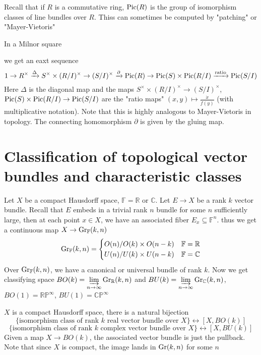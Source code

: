 \documentclass[main]{subfiles}
\begin{document}
Recall that if $R$ is a commutative ring, $\operatorname{Pic}(R)$ is the group of isomorphism classes of line bundles over $R$. Thiss can sometimes be computed by "patching" or "Mayer-Vietoris"

\begin{theorem}[In Weibel I.3]
In a Milnor square
\begin{center}
\end{center}
we get an eaxt sequence
\[1\to R^\times\xrightarrow{\Delta}S^\times\times(R/I)^\times\to(S/I)^\times\xrightarrow{\partial}\operatorname{Pic}(R)\to\operatorname{Pic}(S)\times\operatorname{Pic}(R/I)\xrightarrow{\text{ratio}}\operatorname{Pic}(S/I)\]
Here $\Delta$ is the diagonal map and the maps $S^\times\times(R/I)^\times\to(S/I)^\times$, $\operatorname{Pic}(S)\times\operatorname{Pic}(R/I)\to\operatorname{Pic}(S/I)$ are the "ratio maps" $(x,y)\mapsto\frac{\dot x}{\dot f(y)}$ (with multiplicative notation). Note that this is highly analogous to Mayer-Vietoris in topology. The connecting homomorphism $\partial$ is given by the gluing map.
\end{theorem}

\section{Classification of topological vector bundles and characteristic classes}

Let $X$ be a compact Hausdorff space, $\mathbb F=\mathbb R$ or $\mathbb C$. Let $E\to X$ be a rank $k$ vector bundle. Recall that $E$ embeds in a trivial rank $n$ bundle for some $n$ sufficiently large, then at each point $x\in X$, we have an associated fiber $E_x\subseteq\mathbb F^n$. thus we get a continuous map $X\to\operatorname{Gr}_{\mathbb F}(k,n)$
\[\operatorname{Gr}_{\mathbb F}(k,n)=
\begin{cases}
O(n)/O(k)\times O(n-k)&\mathbb F=\mathbb R \\
U(n)/U(k)\times U(n-k)&\mathbb F=\mathbb C
\end{cases}\]
Over $\operatorname{Gr}_{\mathbb F}(k,n)$, we have a canonical or universal bundle of rank $k$. Now we get classifying space $BO(k)=\displaystyle\varinjlim_{n\to\infty}\operatorname{Gr}_{\mathbb R}(k,n)$ and $BU(k)=\displaystyle\varinjlim_{n\to\infty}\operatorname{Gr}_{\mathbb C}(k,n)$, $BO(1)=\mathbb{RP}^\infty$, $BU(1)=\mathbb{CP}^\infty$

\begin{theorem}
$X$ is a compact Hausdorff space, there is a natural bijection
\[\{\text{isomorphism class of rank $k$ real vector bundle over $X$}\}\leftrightarrow[X,BO(k)]\]
\[\{\text{isomorphism class of rank $k$ complex vector bundle over $X$}\}\leftrightarrow[X,BU(k)]\]
Given a map $X\to BO(k)$, the associated vector bundle is just the pullback. Note that since $X$ is compact, the image lands in $\operatorname{Gr}(k,n)$ for some $n$
\end{theorem}
\end{document}
